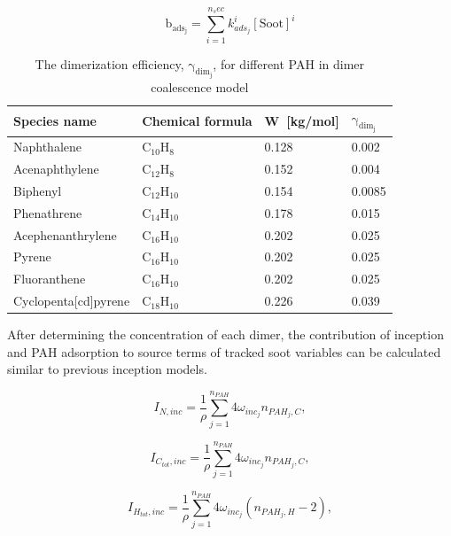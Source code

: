 \begin{equation}
	\mathrm{b_{ads_j}} = \sum_{i=1}^{n_sec} k^i_{ads_{j}} [\mathrm{Soot}]^i
\end{equation}

\renewcommand{\arraystretch}{1.5}
\begin{table}
	\caption{The dimerization efficiency, $\mathrm{\gamma_{dim_j}}$, for different PAH in dimer coalescence model\citep{blanquart2009analyzing}}
	\label{tab:gammalist_dimcoal}
	\centering
	\begin{tabular}{l l l l}
		\hline
		Species name & Chemical formula & W~[kg/mol] & $\mathrm{\gamma_{dim_j}}$\\
		\hline
		Naphthalene & $\mathrm{C_{10}H_{8}}$ & 0.128 & 0.002 \\
		Acenaphthylene & $\mathrm{C_{12}H_{8}}$ & 0.152 & 0.004 \\
		Biphenyl & $\mathrm{C_{12}H_{10}}$ & 0.154 & 0.0085 \\
		Phenathrene & $\mathrm{C_{14}H_{10}}$ & 0.178 & 0.015 \\
		Acephenanthrylene & $\mathrm{C_{16}H_{10}}$ & 0.202 & 0.025 \\
		Pyrene & $\mathrm{C_{16}H_{10}}$ & 0.202 & 0.025 \\
		Fluoranthene & $\mathrm{C_{16}H_{10}}$ & 0.202 & 0.025 \\
		Cyclopenta[cd]pyrene & $\mathrm{C_{18}H_{10}}$ & 0.226 & 0.039 \\
		\hline
	\end{tabular}
\end{table}

After determining the concentration of each dimer, the contribution of inception and PAH adsorption to source terms of tracked soot variables can be calculated similar to previous inception models.

\begin{equation}
	I_{N,{inc}} = \frac{1}{\rho}
	\sum_{j=1}^{n_{PAH}}
	4\omega_{inc_{j}} 
	n_{PAH_j,C}
	\label{eqn:IN_inc_dimcoal},
\end{equation}

\begin{equation}
	I_{C_{tot},{inc}} = \frac{1}{\rho}
	\sum_{j=1}^{n_{PAH}}
	4\omega_{inc_{j}} 
	n_{PAH_j,C}
	\label{eqn:ICtot_inc_dimcoal},
\end{equation}

\begin{equation}
	I_{H_{tot},{inc}} = \frac{1}{\rho}
	\sum_{j=1}^{n_{PAH}}
	4\omega_{inc_{j}} 
	\left(
	n_{PAH_j,H}-2
	\right)
	\label{eqn:IHtot_inc_dimcoal},
\end{equation}

